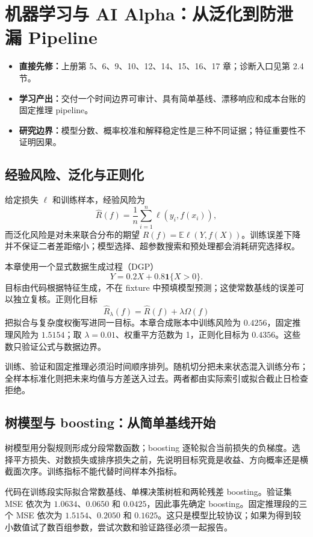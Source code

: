 \chapter{机器学习与 AI Alpha：从泛化到防泄漏 Pipeline}

\begin{itemize}
  \item \textbf{直接先修：}上册第 5、6、9、10、12、14、15、16、17 章；诊断入口见第 2.4 节。
  \item \textbf{学习产出：}交付一个时间边界可审计、具有简单基线、漂移响应和成本台账的固定推理 pipeline。
  \item \textbf{研究边界：}模型分数、概率校准和解释稳定性是三种不同证据；特征重要性不证明因果。
\end{itemize}

\section{经验风险、泛化与正则化}

给定损失 $\ell$ 和训练样本，经验风险为
\[
\widehat R(f)=\frac1n\sum_{i=1}^n\ell(y_i,f(x_i)),
\]
而泛化风险是对未来联合分布的期望 $R(f)=\mathbb E\ell(Y,f(X))$。训练误差下降并不保证二者差距缩小；模型选择、超参数搜索和预处理都会消耗研究选择权。

本章使用一个显式数据生成过程（DGP）
\[
Y=0.2X+0.8\mathbf 1\{X>0\}.
\]
目标由代码根据特征生成，不在 fixture 中预填模型预测；这使常数基线的误差可以独立复核。正则化目标
\[
\widehat R_\lambda(f)=\widehat R(f)+\lambda\Omega(f)
\]
把拟合与复杂度权衡写进同一目标。本章合成账本中训练风险为 $0.4256$，固定推理风险为 $1.5154$；取 $\lambda=0.01$、权重平方范数为 1，正则化目标为 $0.4356$。这些数只验证公式与数据边界。

训练、验证和固定推理必须沿时间顺序排列。随机切分把未来状态混入训练分布；全样本标准化则把未来均值与方差送入过去。两者都由实际索引或拟合截止日检查拒绝。

\section{树模型与 boosting：从简单基线开始}

树模型用分裂规则形成分段常数函数；boosting 逐轮拟合当前损失的负梯度。选择平方损失、对数损失或排序损失之前，先说明目标究竟是收益、方向概率还是横截面次序。训练指标不能代替时间样本外指标。

代码在训练段实际拟合常数基线、单棵决策树桩和两轮残差 boosting。验证集 MSE 依次为 $1.0634$、$0.0650$ 和 $0.0425$，因此事先确定 boosting。固定推理段的三个 MSE 依次为 $1.5154$、$0.2050$ 和 $0.1625$。这只是模型比较协议；如果为得到较小数值试了数百组参数，尝试次数和验证路径必须一起报告。

